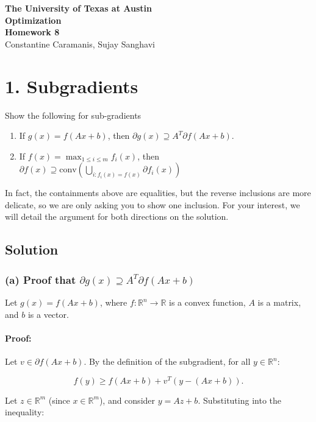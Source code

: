 \documentclass{article}
\begin{document}
\begin{center}
    \textbf{The University of Texas at Austin}\\
    \textbf{Optimization}\\[1ex]
    \textbf{Homework 8}\\[2ex]
    Constantine Caramanis, Sujay Sanghavi
\end{center}

\section*{1. Subgradients} Show the following for sub-gradients
\begin{enumerate}[label=(\alph*)]
    \item If $g(x) = f(Ax + b)$, then $\partial g(x) \supseteq A^T\partial f(Ax + b)$.
    \item If $f(x) = \max_{1\leq i \leq m} f_i(x)$, then $\partial f(x) \supseteq \text{conv}\left(\bigcup_{i:f_i(x)=f(x)} \partial f_i(x)\right)$
\end{enumerate}

In fact, the containments above are equalities, but the reverse inclusions are more delicate, so we are only asking you to show one inclusion. For your interest, we will detail the argument for both directions on the solution.

\subsection*{Solution}

\subsubsection*{(a) Proof that $\partial g(x) \supseteq A^T\partial f(Ax + b)$}

Let $g(x) = f(Ax + b)$, where $f: \mathbb{R}^n \rightarrow \mathbb{R}$ is a convex function, $A$ is a matrix, and $b$ is a vector.

\paragraph{Proof:}
Let $v \in \partial f(Ax + b)$. By the definition of the subgradient, for all $y \in \mathbb{R}^n$:

$$f(y) \geq f(Ax + b) + v^T (y - (Ax + b)).$$

Let $z \in \mathbb{R}^m$ (since $x \in \mathbb{R}^m$), and consider $y = Az + b$. Substituting into the inequality:
\end{document}
